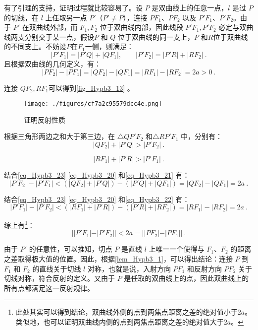 有了引理的支持，证明过程就比较容易了。设 $P$ 是双曲线上的任意一点，$l$ 是过 $P$ 的切线，在 $l$ 上任取另一点 $P'$（$P'\neq P$），连接 $PF_1$、$PF_2$ 以及 $P'F_1$、$P'F_2$。由于 $P'$ 在双曲线外部，而 $F_1,F_2$ 位于双曲线内部，因此线段 $P'F_1,P'F_2$ 必定与双曲线两支分别交于某一点，假设$P$ 和 $Q$ 位于双曲线的同一支上，$P$ 和$R$位于双曲线的不同支上。不妨设$P$在$F_1$一侧，则满足：
\begin{equation}\label{eq_Hypb3_23}
|P'F_1|=|P'Q|+|QF_1|,\qquad  |P'F_2|=|P'R|+|RF_2|~.
\end{equation}
且根据双曲线的几何定义，有：
\begin{equation}\label{eq_Hypb3_20}
|PF_2| - |PF_1|=|QF_2| - |QF_1|=|RF_1|-|RF_2|=2a>0~.
\end{equation}

连接 $QF_2,RF_1$可以得到\autoref{fig_Hypb3_13} 。
\begin{figure}[ht]
\centering
\texttt{[image: ./figures/cf7a2c95579dcc4e.png]}
\caption{证明反射性质}  \label{fig_Hypb3_13}
\end{figure}

根据三角形两边之和大于第三边，在 $\triangle QP'F_2$ 和$\triangle RP'F_1$ 中，分别有：
\begin{equation}\label{eq_Hypb3_21}
|QF_2| + |P'Q| > |P'F_2|~.
\end{equation}

\begin{equation}\label{eq_Hypb3_22}
|RF_1| + |P'R| > |P'F_1|~.
\end{equation}

结合\autoref{eq_Hypb3_23} \autoref{eq_Hypb3_20} 和\autoref{eq_Hypb3_21} 有：
\begin{equation}
|P'F_2| - |P'F_1|<(|QF_2| + |P'Q|)-(|P'Q|+|QF_1|)=|QF_2|-|QF_1|=2a~.
\end{equation}

结合\autoref{eq_Hypb3_23} \autoref{eq_Hypb3_20} 和\autoref{eq_Hypb3_22} 有：
\begin{equation}
|P'F_1|-|P'F_2|<(|RF_1| + |P'R|)-(|P'R|+|RF_2|)=|RF_1|-|RF_2|=2a~.
\end{equation}

综上有\footnote{此处其实可以得到结论，双曲线外侧的点到两焦点距离之差的绝对值小于$2a$。类似地，也可以证明双曲线内侧的点到两焦点距离之差的绝对值大于$2a$。}：
\begin{equation}
||P'F_1|-|P'F_2||<2a=||PF_2| - |PF_1||~.
\end{equation}

由于 $P'$ 的任意性，可以推知，切点 $P$ 是直线 $l$ 上唯一一个使得与 $F_1$、$F_2$ 的距离之差取得极大值的位置。因此，根据\autoref{lem_Hypb3_1}，可以得出结论：连接 $P$ 到 $F_1$ 和 $F_2$ 的直线关于切线 $l$ 对称，也就是说，入射方向 $PF_1$ 和反射方向 $PF_2$ 关于切线对称，符合反射的定义。又由于 $P$ 是任取的双曲线上的点，因此双曲线上的所有点都满足这一反射规律。

